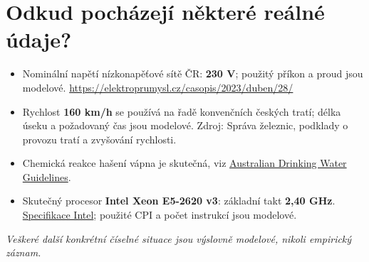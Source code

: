 \documentclass[11pt,a4paper]{article}
\begin{document}
\vspace{4mm}\par\noindent\dotfill\par\medskip
\section*{Odkud pocházejí některé reálné údaje?}
\begin{itemize}
\item Nominální napětí nízkonapěťové sítě ČR: \textbf{230 V}; použitý příkon a proud jsou modelové. \url{https://elektroprumysl.cz/casopis/2023/duben/28/}
\item Rychlost \textbf{160 km/h} se používá na řadě konvenčních českých tratí; délka úseku a požadovaný čas jsou modelové. Zdroj: Správa železnic, podklady o provozu tratí a zvyšování rychlosti.
\item Chemická reakce hašení vápna je skutečná, viz \href{https://guidelines.nhmrc.gov.au/australian-drinking-water-guidelines/part-5/treatment-chemicals/calcium-oxide}{Australian Drinking Water Guidelines}.
\item Skutečný procesor \textbf{Intel Xeon E5-2620 v3}: základní takt \textbf{2,40 GHz}. \href{https://www.intel.com/content/www/us/en/products/sku/83352/intel-xeon-processor-e52620-v3-15m-cache-2-40-ghz/specifications.html}{Specifikace Intel}; použité CPI a počet instrukcí jsou modelové.
\end{itemize}
\textit{Veškeré další konkrétní číselné situace jsou výslovně modelové, nikoli empirický záznam.}
\end{document}
